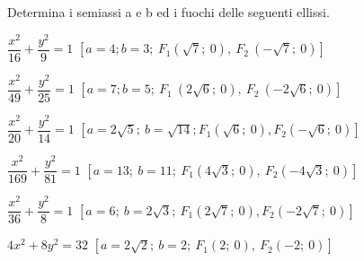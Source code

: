 \begin{esercizio}
  \label{ese:div.003}
  Determina i semiassi a e b ed i fuochi delle seguenti ellissi.
  \begin{enumeratea}
    \item \(\dfrac{x^{2}}{16} + \dfrac{y^{2}}{9} =1\) 
    \hfill
      \(\left[a=4; b=3;~F_{1} \left( 
\sqrt{7};~0\right),~F_{2}~\left(- \sqrt{7};~0\right)\right]\)
    \item \( \dfrac{x^{2}}{49} + \dfrac{y^{2}}{25} =1\)  
    \hfill
      \(\left[a=7; b=5;~F_{1}~\left(2 
\sqrt{6};~0\right),~F_{2}~\left(-2 \sqrt{6};~0\right)\right]\)
      \item \( \dfrac{x^{2}}{20} + \dfrac{y^{2}}{14} =1\)
      \hfill \(\left[a=2 \sqrt{5} ;~ b= \sqrt{14} ;  F_{1}  
\left(\sqrt{6} ;~ 0\right),  F_{2}  \left(-\sqrt{6} ;~0\right)\right]\)
      \item \( \dfrac{x^{2}}{169} + \dfrac{y^{2}}{81} =1\)
      \hfill \(\left[a=13 ;~b=11 ;~F_{1}  \left(4 \sqrt{3} 
;~0\right),~F_{2}  \left(-4 \sqrt{3} ;~0\right)\right]\)
      \item \( \dfrac{x^{2}}{36} + \dfrac{y^{2}}{8} =1\)
      \hfill \(\left[a=6 ;~b=2 \sqrt{3}  ;~F_{1}  \left(2 \sqrt{7} 
;~0\right),  F_{2}  \left(-2 \sqrt{7} ;~0\right)\right]\)
      
      \item  \(4 {x^{2}} +{8y^{2}} =32\)
      \hfill \(\left[a=2 \sqrt{2}  ;~b=2 ;  ~F_{1}  (2;~0), ~ F_{2}  
(-2;~ 0)\right]\)
  \end{enumeratea}
\end{esercizio}

